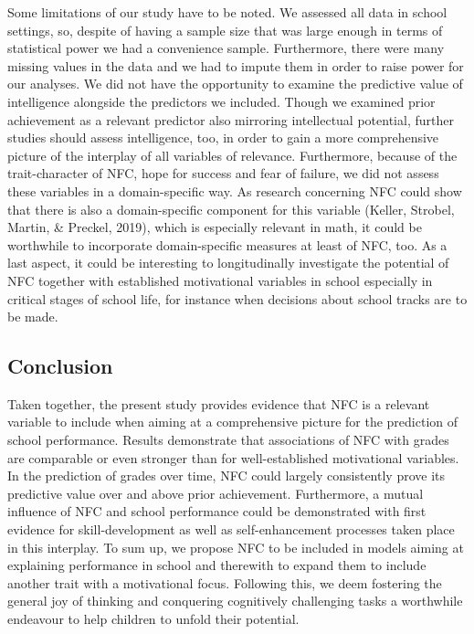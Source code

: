 \documentclass[
  man]{apa6}
\begin{document}
Some limitations of our study have to be noted. We assessed all data in school settings, so, despite of having a sample size that was large enough in terms of statistical power we had a convenience sample. Furthermore, there were many missing values in the data and we had to impute them in order to raise power for our analyses. We did not have the opportunity to examine the predictive value of intelligence alongside the predictors we included. Though we examined prior achievement as a relevant predictor also mirroring intellectual potential, further studies should assess intelligence, too, in order to gain a more comprehensive picture of the interplay of all variables of relevance. Furthermore, because of the trait-character of NFC, hope for success and fear of failure, we did not assess these variables in a domain-specific way. As research concerning NFC could show that there is also a domain-specific component for this variable (Keller, Strobel, Martin, \& Preckel, 2019), which is especially relevant in math, it could be worthwhile to incorporate domain-specific measures at least of NFC, too. As a last aspect, it could be interesting to longitudinally investigate the potential of NFC together with established motivational variables in school especially in critical stages of school life, for instance when decisions about school tracks are to be made.

\hypertarget{conclusion}{%
\subsection{Conclusion}\label{conclusion}}

Taken together, the present study provides evidence that NFC is a relevant variable to include when aiming at a comprehensive picture for the prediction of school performance. Results demonstrate that associations of NFC with grades are comparable or even stronger than for well-established motivational variables. In the prediction of grades over time, NFC could largely consistently prove its predictive value over and above prior achievement. Furthermore, a mutual influence of NFC and school performance could be demonstrated with first evidence for skill-development as well as self-enhancement processes taken place in this interplay. To sum up, we propose NFC to be included in models aiming at explaining performance in school and therewith to expand them to include another trait with a motivational focus. Following this, we deem fostering the general joy of thinking and conquering cognitively challenging tasks a worthwhile endeavour to help children to unfold their potential.
\end{document}
